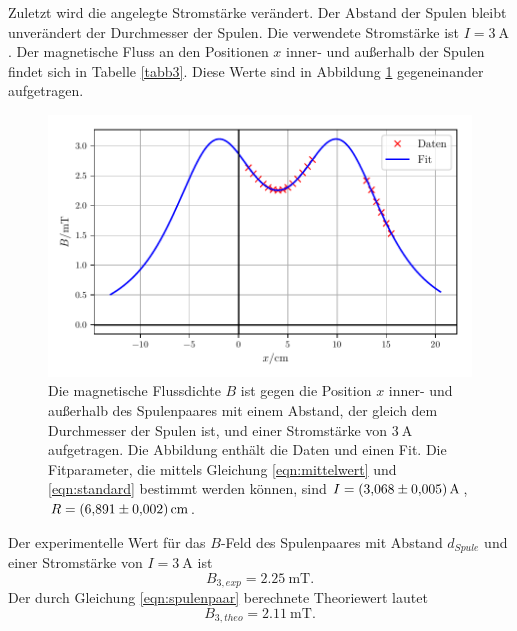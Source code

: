 \noindent Zuletzt wird die angelegte Stromstärke verändert. Der Abstand
der Spulen bleibt unverändert der Durchmesser der Spulen.
Die verwendete Stromstärke ist $I = \SI{3}{\ampere}$.
Der magnetische Fluss an den Positionen $x$ inner- und außerhalb
der Spulen findet sich in Tabelle \ref{tabb3}.
Diese Werte sind in Abbildung \ref{plotb3} gegeneinander
aufgetragen.


\begin{figure}
    \centering
    \includegraphics{build/plotb3.pdf}
    \caption{Die magnetische Flussdichte $B$ ist gegen die Position $x$ inner-
    und außerhalb des Spulenpaares mit einem Abstand, der gleich dem Durchmesser
    der Spulen ist, und einer Stromstärke von $\SI{3}{\ampere}$ aufgetragen.
    Die Abbildung enthält die Daten und einen Fit.
    Die Fitparameter, die mittels Gleichung \eqref{eqn:mittelwert} und \eqref{eqn:standard}
    bestimmt werden können, sind $I = \SI{3.068 \pm 0.005}{\ampere}$,
    $R = \SI{6.891 \pm 0.002}{\centi\meter}$.}
    \label{plotb3}
\end{figure}

\noindent Der experimentelle Wert für das $B$-Feld des Spulenpaares
mit Abstand $d_{Spule}$ und einer Stromstärke von $I = \SI{3}{\ampere}$
ist
\begin{equation*}
   B_{3,exp} = \SI{2.25}{\milli\tesla}.
\end{equation*}
Der durch Gleichung \eqref{eqn:spulenpaar} berechnete Theoriewert
lautet
\begin{equation*}
   B_{3,theo} = \SI{2.11}{\milli\tesla}.
\end{equation*}

